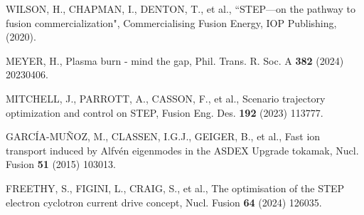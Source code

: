\documentclass[10pt, a4paper, twoside]{article}
\begin{document}
\fontsize{9}{12}\selectfont
\setlength{\parskip}{0pt}
\begin{thebibliography}{9}

    WILSON, H., CHAPMAN, I., DENTON, T., et al., 
    ``STEP---on the pathway to fusion commercialization", 
    Commercialising Fusion Energy, 
    IOP Publishing, 
    (2020).

    MEYER, H.,
    Plasma burn - mind the gap,
    Phil. Trans. R. Soc. A
    \textbf{382} 
    (2024)
    20230406.


    MITCHELL, J., PARROTT, A., CASSON, F., et al.,
    Scenario trajectory optimization and control on STEP,
    Fusion Eng. Des.
    \textbf{192} 
    (2023) 
    113777.


    GARC\'IA-MU\~NOZ, M., CLASSEN, I.G.J., GEIGER, B., et al., 
    Fast ion transport induced by Alfv\'en eigenmodes in the ASDEX Upgrade tokamak, 
    Nucl. Fusion 
    \textbf{51} 
    (2015) 
    103013.

    FREETHY, S., FIGINI, L., CRAIG, S., et al., 
    The optimisation of the STEP electron cyclotron current drive concept,
    Nucl. Fusion
    \textbf{64} 
    (2024)
    126035.


\end{thebibliography}
\end{document}
